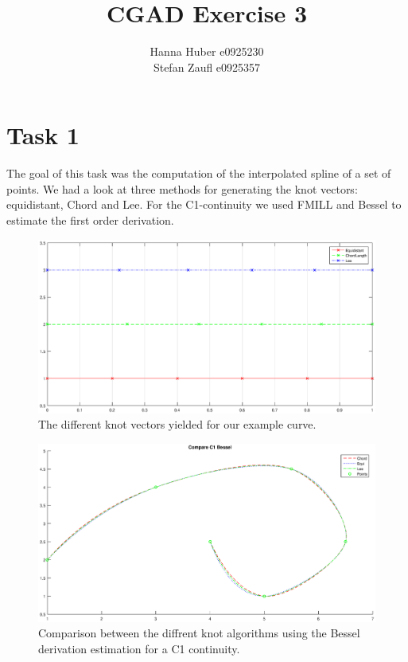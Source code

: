 \documentclass[12pt,a4paper]{article}
\title{CGAD Exercise 3}
\author{Hanna Huber e0925230\\Stefan Zaufl e0925357}
\begin{document}
\maketitle
\section{Task 1}
The goal of this task was the computation of the interpolated spline of a set of points. We had a look at three methods for generating the knot vectors: equidistant, Chord and Lee. For the C1-continuity we used FMILL and Bessel to estimate the first order derivation.

\begin{figure}[hbtp]
\centering
\includegraphics[width=\textwidth]{knotvectors.eps}
\caption{The different knot vectors yielded for our example curve.}
\end{figure}

\begin{figure}[hbtp]
\centering
\includegraphics[width=\textwidth]{compC1Bessel.eps}
\caption{Comparison between the diffrent knot algorithms using the Bessel derivation estimation for a C1 continuity.}
\end{figure}
\end{document}
